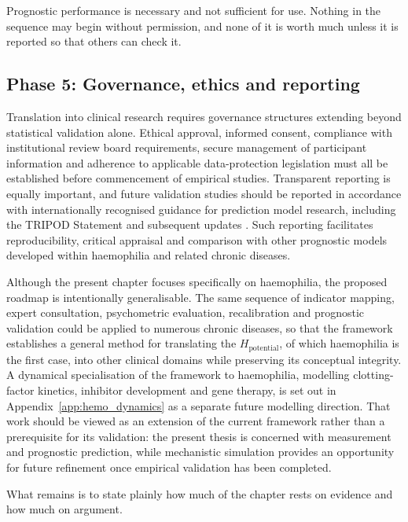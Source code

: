 Prognostic performance is necessary and not sufficient for use. Nothing in
the sequence may begin without permission, and none of it is worth much unless
it is reported so that others can check it.

\subsection{Phase 5: Governance, ethics and reporting}

Translation into clinical research requires governance structures extending beyond statistical validation alone. Ethical approval, informed consent, compliance with institutional review board requirements, secure management of participant information and adherence to applicable data-protection legislation must all be established before commencement of empirical studies. Transparent reporting is equally important, and future validation studies should be reported in accordance with internationally recognised guidance for prediction model research, including the TRIPOD Statement and subsequent updates \citep{collins_2015,moons_2019}. Such reporting facilitates reproducibility, critical appraisal and comparison with other prognostic models developed within haemophilia and related chronic diseases.

Although the present chapter focuses specifically on haemophilia, the proposed roadmap is intentionally generalisable. The same sequence of indicator mapping, expert consultation, psychometric evaluation, recalibration and prognostic validation could be applied to numerous chronic diseases, so that the framework establishes a general method for translating the $H_{\text{potential}}$, of which haemophilia is the first case, into other clinical domains while preserving its conceptual integrity. A dynamical specialisation of the framework to haemophilia, modelling clotting-factor kinetics, inhibitor development and gene therapy, is set out in Appendix~\ref{app:hemo_dynamics} as a separate future modelling direction. That work should be viewed as an extension of the current framework rather than a prerequisite for its validation: the present thesis is concerned with measurement and prognostic prediction, while mechanistic simulation provides an opportunity for future refinement once empirical validation has been completed.

What remains is to state plainly how much of the chapter rests on evidence and
how much on argument.


